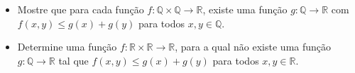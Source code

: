 \begin{itemize}
\item[(a)]  Mostre que para cada função \(f\colon \mathbb{Q} \times \mathbb{Q} \to \mathbb{R}\), existe uma função \(g\colon \mathbb{Q}\to \mathbb{R}\) com \(f(x,y) \leq g(x)+g(y) \) para todos \(x,y\in \mathbb{Q}\).
\item[(b)] Determine uma função \(f\colon \mathbb{R} \times \mathbb{R} \to \mathbb{R}\), para a qual não existe uma função \(g\colon \mathbb{Q}\to \mathbb{R}\) tal que \(f(x,y) \leq g(x)+g(y) \) para todos \(x,y\in \mathbb{R}\).
\end{itemize}
